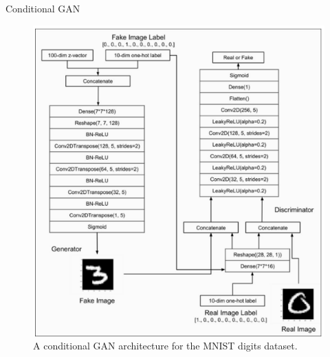 \begin{frame}[allowframebreaks]{Conditional GAN}
\framebreak
\begin{figure}
    \centering
    \includegraphics[height=0.8\textheight, width=\textwidth, keepaspectratio]{images/gan/cond_gan_2.png}
    \caption*{A conditional GAN architecture for the MNIST digits dataset.}
\end{figure}

\end{frame}

